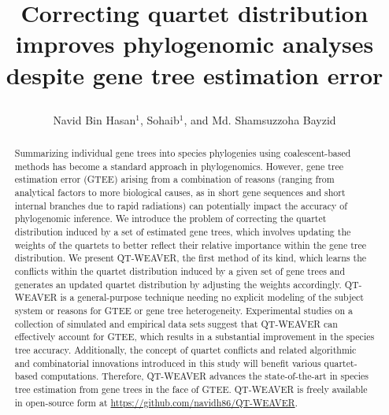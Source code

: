 \documentclass[10pt,a4paper]{article}
\title{Correcting quartet distribution improves phylogenomic analyses despite gene tree estimation error
\author[1,*]{Navid Bin Hasan$^{1}$, Sohaib$^{1}$, and Md. Shamsuzzoha Bayzid}
}
\affil[1]{Department of Computer Science and Engineering\protect \\
Bangladesh University of Engineering and Technology, Dhaka-1205, Bangladesh}
\affil[*]{Corresponding author: shams\_bayzid@cse.buet.ac.bd}
\date{}
\begin{document}
\maketitle




\begin{abstract}
Summarizing individual gene trees into species phylogenies using coalescent-based methods has become a standard approach in phylogenomics. 
However, gene tree estimation error (GTEE) arising from a combination of reasons (ranging from analytical factors to more biological causes, as in short gene sequences and short internal branches due to rapid radiations) can potentially impact the accuracy of phylogenomic inference.
We introduce the problem of correcting the quartet distribution induced by a set of estimated gene trees, which involves updating the weights of the quartets to better reflect their relative importance within the gene tree distribution. We present QT-WEAVER, the first method of its kind, which learns the conflicts within the quartet distribution induced by a given set of gene trees and generates an updated quartet distribution by adjusting the weights accordingly. QT-WEAVER is a general-purpose technique needing no explicit modeling of the subject system or reasons for GTEE or gene tree heterogeneity. Experimental studies on a collection of simulated and empirical data sets suggest that QT-WEAVER can effectively account for GTEE, which results in a substantial improvement in the species tree accuracy. Additionally, the concept of quartet conflicts and related algorithmic and combinatorial innovations introduced in this study will benefit various quartet-based computations. Therefore, QT-WEAVER advances the state-of-the-art in species tree estimation from gene trees in the face of GTEE. QT-WEAVER is freely available in open-source form at \url{https://github.com/navidh86/QT-WEAVER}.






\end{abstract}
\end{document}
